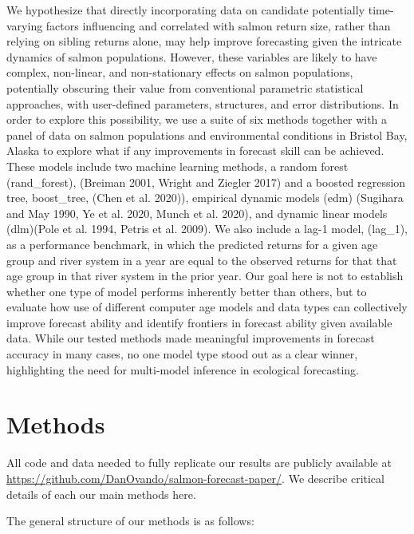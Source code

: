 \documentclass[
]{article}
\begin{document}
We hypothesize that directly incorporating data on candidate potentially time-varying factors influencing and correlated with salmon return size, rather than relying on sibling returns alone, may help improve forecasting given the intricate dynamics of salmon populations. However, these variables are likely to have complex, non-linear, and non-stationary effects on salmon populations, potentially obscuring their value from conventional parametric statistical approaches, with user-defined parameters, structures, and error distributions. In order to explore this possibility, we use a suite of six methods together with a panel of data on salmon populations and environmental conditions in Bristol Bay, Alaska to explore what if any improvements in forecast skill can be achieved. These models include two machine learning methods, a random forest (rand\_forest), (Breiman 2001, Wright and Ziegler 2017) and a boosted regression tree, boost\_tree, (Chen et al. 2020)), empirical dynamic models (edm) (Sugihara and May 1990, Ye et al. 2020, Munch et al. 2020), and dynamic linear models (dlm)(Pole et al. 1994, Petris et al. 2009). We also include a lag-1 model, (lag\_1), as a performance benchmark, in which the predicted returns for a given age group and river system in a year are equal to the observed returns for that that age group in that river system in the prior year. Our goal here is not to establish whether one type of model performs inherently better than others, but to evaluate how use of different computer age models and data types can collectively improve forecast ability and identify frontiers in forecast ability given available data. While our tested methods made meaningful improvements in forecast accuracy in many cases, no one model type stood out as a clear winner, highlighting the need for multi-model inference in ecological forecasting.

\hypertarget{methods}{%
\section*{Methods}\label{methods}}

All code and data needed to fully replicate our results are publicly available at \url{https://github.com/DanOvando/salmon-forecast-paper/}. We describe critical details of each our main methods here.

The general structure of our methods is as follows:
\end{document}
